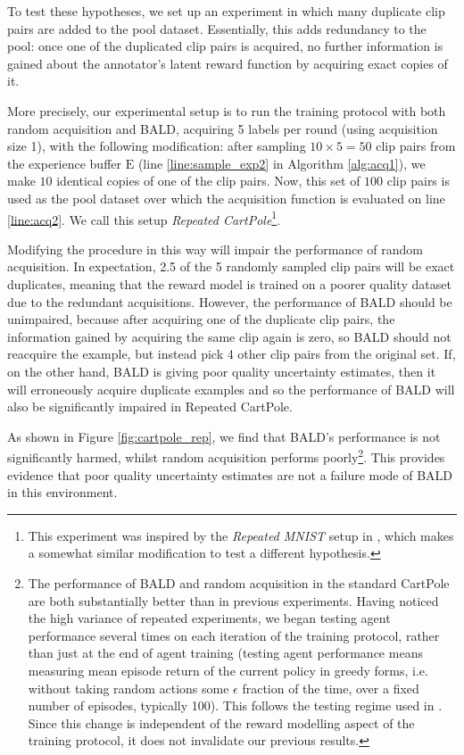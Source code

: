 \documentclass[11pt, a4paper, bibliography=totoc]{report}
\newcommand{\expbuff}{\mathrm{E}}
\begin{document}
To test these hypotheses, we set up an experiment in which many duplicate clip pairs are added to the pool dataset. Essentially, this adds redundancy to the pool: once one of the duplicated clip pairs is acquired, no further information is gained about the annotator's latent reward function by acquiring exact copies of it.

More precisely, our experimental setup is to run the training protocol with both random acquisition and BALD, acquiring 5 labels per round (using acquisition size 1), with the following modification: after sampling $ 10\times 5 = 50 $ clip pairs from the experience buffer $ \expbuff $ (line \ref{line:sample_exp2} in Algorithm \ref{alg:acq1}), we make $ 10 $ identical copies of one of the clip pairs. Now, this set of $ 100 $ clip pairs is used as the pool dataset over which the acquisition function is evaluated on line \ref{line:acq2}. We call this setup \textit{Repeated CartPole}\footnote{This experiment was inspired by the \textit{Repeated MNIST} setup in \cite{Kirsch2019a}, which makes a somewhat similar modification to test a different hypothesis.}.

Modifying the procedure in this way will impair the performance of random acquisition. In expectation, 2.5 of the 5 randomly sampled clip pairs will be exact duplicates, meaning that the reward model is trained on a poorer quality dataset due to the redundant acquisitions. However, the performance of BALD should be unimpaired, because after acquiring one of the duplicate clip pairs, the information gained by acquiring the same clip again is zero, so BALD should not reacquire the example, but instead pick 4 other clip pairs from the original set. If, on the other hand, BALD is giving poor quality uncertainty estimates, then it will erroneously acquire duplicate examples and so the performance of BALD will also be significantly impaired in Repeated CartPole.

As shown in Figure \ref{fig:cartpole_rep}, we find that BALD's performance is not significantly harmed, whilst random acquisition performs poorly\footnote{The performance of BALD and random acquisition in the standard CartPole are both substantially better than in previous experiments. Having noticed the high variance of repeated experiments, we began testing agent performance several times on each iteration of the training protocol, rather than just at the end of agent training (testing agent performance means measuring mean episode return of the current policy in greedy forms, i.e. without taking random actions some $ \epsilon $ fraction of the time, over a fixed number of episodes, typically 100). This follows the testing regime used in \cite{Mnih2015}. Since this change is independent of the reward modelling aspect of the training protocol, it does not invalidate our previous results.}. This provides evidence that poor quality uncertainty estimates are not a failure mode of BALD in this environment.
\end{document}
